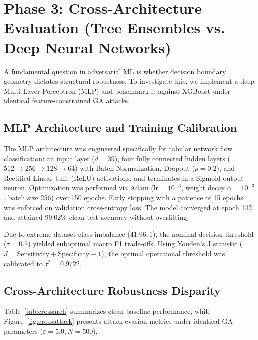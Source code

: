\documentclass[final,5p,times,twocolumn]{elsarticle}
\begin{document}
\section{Phase 3: Cross-Architecture Evaluation (Tree Ensembles vs. Deep Neural Networks)}
\label{sec:phase3}

A fundamental question in adversarial ML is whether decision boundary geometry dictates structural robustness. To investigate this, we implement a deep Multi-Layer Perceptron (MLP) and benchmark it against XGBoost under identical feature-constrained GA attacks.

\subsection{MLP Architecture and Training Calibration}
The MLP architecture was engineered specifically for tabular network flow classification: an input layer ($d=39$), four fully connected hidden layers ($512 \rightarrow 256 \rightarrow 128 \rightarrow 64$) with Batch Normalization, Dropout ($p=0.2$), and Rectified Linear Unit (ReLU) activations, and terminates in a Sigmoid output neuron. Optimization was performed via Adam ($\text{lr} = 10^{-3}$, weight decay $\alpha = 10^{-3}$, batch size 256) over 150 epochs. Early stopping with a patience of 15 epochs was enforced on validation cross-entropy loss. The model converged at epoch 142 and attained 99.02\% clean test accuracy without overfitting.

Due to extreme dataset class imbalance ($41.96:1$), the nominal decision threshold ($\tau = 0.5$) yielded suboptimal macro F1 trade-offs. Using Youden's J statistic ($J = \text{Sensitivity} + \text{Specificity} - 1$), the optimal operational threshold was calibrated to $\tau^* = 0.9722$.

\subsection{Cross-Architecture Robustness Disparity}
Table~\ref{tab:crossarch} summarizes clean baseline performance, while Figure~\ref{fig:crossattack} presents attack evasion metrics under identical GA parameters ($\varepsilon = 5.0, N=500$).
\end{document}

